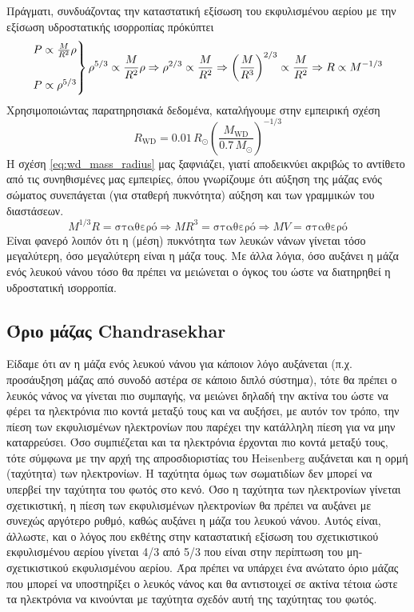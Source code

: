 Πράγματι, συνδυάζοντας την καταστατική εξίσωση του εκφυλισμένου αερίου με την εξίσωση υδροστατικής ισορροπίας πρόκύπτει
\begin{equation*}
	\begin{rcases}
    	P \propto \frac{M}{R^2} \rho \\\\
        P \propto \rho^{5/3}
    \end{rcases}
    \rho^{5/3} \propto \frac{M}{R^2} \rho \Rightarrow \rho^{2/3} \propto \frac{M}{R^2} \Rightarrow \left( \frac{M}{R^3} \right)^{2/3} \propto \frac{M}{R^2} \Rightarrow R \propto M^{-1/3}
\end{equation*}Χρησιμοποιώντας παρατηρησιακά δεδομένα, καταλήγουμε στην εμπειρική σχέση
\begin{equation}
	R_{\text{WD}} = 0.01\,R_\odot \left( \frac{M_{\text{WD}}}{0.7\,M_\odot} \right)^{-1/3} 
    \label{eq:wd_mass_radius}
\end{equation}
Η σχέση \eqref{eq:wd_mass_radius} μας ξαφνιάζει, γιατί αποδεικνύει ακριβώς το αντίθετο από τις συνηθισμένες μας εμπειρίες, όπου γνωρίζουμε ότι αύξηση της μάζας ενός σώματος συνεπάγεται (για σταθερή πυκνότητα) αύξηση και των γραμμικών του διαστάσεων.
$$M^{1/3} R = \text{σταθερό} \Rightarrow MR^3 = \text{σταθερό} \Rightarrow MV = \text{σταθερό}$$
Είναι φανερό λοιπόν ότι η (μέση) πυκνότητα των λευκών νάνων γίνεται τόσο μεγαλύτερη, όσο μεγαλύτερη είναι η μάζα τους. Με άλλα λόγια, όσο αυξάνει η μάζα ενός λευκού νάνου τόσο θα πρέπει να μειώνεται ο όγκος του ώστε να διατηρηθεί η υδροστατική ισορροπία.


\subsection{Όριο μάζας Chandrasekhar}
Είδαμε ότι αν η μάζα ενός λευκού νάνου για κάποιον λόγο αυξάνεται (π.χ. προσάυξηση μάζας από συνοδό αστέρα σε κάποιο διπλό σύστημα), τότε θα πρέπει ο λευκός νάνος να γίνεται πιο συμπαγής, να μειώνει δηλαδή την ακτίνα του ώστε να φέρει τα ηλεκτρόνια πιο κοντά μεταξύ τους και να αυξήσει, με αυτόν τον τρόπο, την πίεση των εκφυλισμένων ηλεκτρονίων που παρέχει την κατάλληλη πίεση για να μην καταρρεύσει.  Όσο συμπιέζεται και τα ηλεκτρόνια έρχονται πιο κοντά μεταξύ τους, τότε σύμφωνα με την αρχή της απροσδιοριστίας του Heisenberg αυξάνεται και η ορμή (ταχύτητα) των ηλεκτρονίων. Η ταχύτητα όμως των σωματιδίων δεν μπορεί να υπερβεί την ταχύτητα του φωτός στο κενό. Όσο η ταχύτητα των ηλεκτρονίων γίνεται σχετικιστική, η πίεση των εκφυλισμένων ηλεκτρονίων θα πρέπει να αυξάνει με συνεχώς αργότερο ρυθμό, καθώς αυξάνει η μάζα του λευκού νάνου. Αυτός είναι, άλλωστε, και ο λόγος που εκθέτης στην καταστατική εξίσωση του σχετικιστικού εκφυλισμένου αερίου γίνεται 4/3 από 5/3 που είναι στην περίπτωση του μη-σχετικιστικού εκφυλισμένου αερίου. 
Άρα πρέπει να υπάρχει ένα ανώτατο όριο μάζας που μπορεί να υποστηρίξει ο λευκός νάνος και θα αντιστοιχεί σε ακτίνα τέτοια ώστε τα ηλεκτρόνια να κινούνται με ταχύτητα σχεδόν αυτή της ταχύτητας του φωτός.

